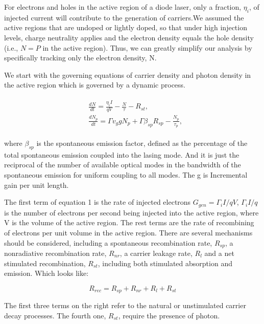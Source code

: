 For electrons and holes in the active region of a diode laser, only a fraction,
$\eta_i$, of injected current will contribute to the generation of carriers.We
assumed the active regions that are undoped or lightly doped, so that under
high injection levels, charge neutrality applies and the electron density
equals the hole density (i.e., $N = P$ in the active region). Thus, we can
greatly simplify our analysis by specifically tracking only the electron
density, N.

We start with the governing equations of carrier density and photon density in
the active region which is governed by a dynamic process.

\begin{eqnarray}
\begin{aligned}
  & \frac{dN}{dt} = \frac{\eta_{i}I}{qV} - \frac{N}{\tau} - R_{st},
  \\
  & \frac{dN_p}{dt} = {\Gamma}v_g{g}N_p + \Gamma\beta_{sp}R_{sp} - \frac{N_p}{\tau_p},
\end{aligned}
\label{eq:eight}
\end{eqnarray}

where $\beta_{sp}$ is the spontaneous emission factor, defined as the
percentage of the total spontaneous emission coupled into the lasing mode. And it is
just the reciprocal of the number of available optical modes in the bandwidth of
the spontaneous emission for uniform coupling to all modes. The g is Incremental gain
per unit length.

The first term of equation 1 is the rate of injected electrons $G_{gen} =
{\Gamma_{i}I}/{qV}$, ${\Gamma_{i}I}/{q}$ is the number of electrons per
second being injected into the active region, where V is the volume of the
active region. The rest terms are the rate of recombining of electrons per unit
volume in the active region. There are several mechanisms should be considered,
including a spontaneous recombination rate, $R_{sp}$, a nonradiative
recombination rate, $R_{nr}$, a carrier leakage rate, $R_l$ and a net
stimulated recombination, $R_{st}$, including both stimulated absorption and
emission. Which looks like:

\begin{equation}
  R_{rec} = R_{sp} + R_{nr} + R_{l} + R_{st}
\end{equation}

The first three terms on the right refer to the natural or unstimulated carrier
decay processes. The fourth one, $R_{st}$, require the presence of photon.

